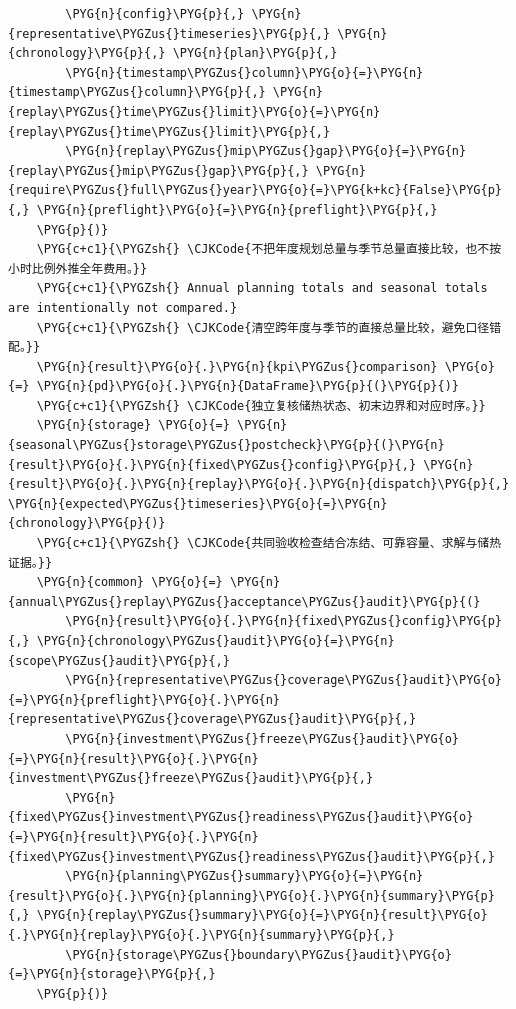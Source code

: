 \begin{Verbatim}
        \PYG{n}{config}\PYG{p}{,} \PYG{n}{representative\PYGZus{}timeseries}\PYG{p}{,} \PYG{n}{chronology}\PYG{p}{,} \PYG{n}{plan}\PYG{p}{,}
        \PYG{n}{timestamp\PYGZus{}column}\PYG{o}{=}\PYG{n}{timestamp\PYGZus{}column}\PYG{p}{,} \PYG{n}{replay\PYGZus{}time\PYGZus{}limit}\PYG{o}{=}\PYG{n}{replay\PYGZus{}time\PYGZus{}limit}\PYG{p}{,}
        \PYG{n}{replay\PYGZus{}mip\PYGZus{}gap}\PYG{o}{=}\PYG{n}{replay\PYGZus{}mip\PYGZus{}gap}\PYG{p}{,} \PYG{n}{require\PYGZus{}full\PYGZus{}year}\PYG{o}{=}\PYG{k+kc}{False}\PYG{p}{,} \PYG{n}{preflight}\PYG{o}{=}\PYG{n}{preflight}\PYG{p}{,}
    \PYG{p}{)}
    \PYG{c+c1}{\PYGZsh{} \CJKCode{不把年度规划总量与季节总量直接比较，也不按小时比例外推全年费用。}}
    \PYG{c+c1}{\PYGZsh{} Annual planning totals and seasonal totals are intentionally not compared.}
    \PYG{c+c1}{\PYGZsh{} \CJKCode{清空跨年度与季节的直接总量比较，避免口径错配。}}
    \PYG{n}{result}\PYG{o}{.}\PYG{n}{kpi\PYGZus{}comparison} \PYG{o}{=} \PYG{n}{pd}\PYG{o}{.}\PYG{n}{DataFrame}\PYG{p}{(}\PYG{p}{)}
    \PYG{c+c1}{\PYGZsh{} \CJKCode{独立复核储热状态、初末边界和对应时序。}}
    \PYG{n}{storage} \PYG{o}{=} \PYG{n}{seasonal\PYGZus{}storage\PYGZus{}postcheck}\PYG{p}{(}\PYG{n}{result}\PYG{o}{.}\PYG{n}{fixed\PYGZus{}config}\PYG{p}{,} \PYG{n}{result}\PYG{o}{.}\PYG{n}{replay}\PYG{o}{.}\PYG{n}{dispatch}\PYG{p}{,} \PYG{n}{expected\PYGZus{}timeseries}\PYG{o}{=}\PYG{n}{chronology}\PYG{p}{)}
    \PYG{c+c1}{\PYGZsh{} \CJKCode{共同验收检查结合冻结、可靠容量、求解与储热证据。}}
    \PYG{n}{common} \PYG{o}{=} \PYG{n}{annual\PYGZus{}replay\PYGZus{}acceptance\PYGZus{}audit}\PYG{p}{(}
        \PYG{n}{result}\PYG{o}{.}\PYG{n}{fixed\PYGZus{}config}\PYG{p}{,} \PYG{n}{chronology\PYGZus{}audit}\PYG{o}{=}\PYG{n}{scope\PYGZus{}audit}\PYG{p}{,}
        \PYG{n}{representative\PYGZus{}coverage\PYGZus{}audit}\PYG{o}{=}\PYG{n}{preflight}\PYG{o}{.}\PYG{n}{representative\PYGZus{}coverage\PYGZus{}audit}\PYG{p}{,}
        \PYG{n}{investment\PYGZus{}freeze\PYGZus{}audit}\PYG{o}{=}\PYG{n}{result}\PYG{o}{.}\PYG{n}{investment\PYGZus{}freeze\PYGZus{}audit}\PYG{p}{,}
        \PYG{n}{fixed\PYGZus{}investment\PYGZus{}readiness\PYGZus{}audit}\PYG{o}{=}\PYG{n}{result}\PYG{o}{.}\PYG{n}{fixed\PYGZus{}investment\PYGZus{}readiness\PYGZus{}audit}\PYG{p}{,}
        \PYG{n}{planning\PYGZus{}summary}\PYG{o}{=}\PYG{n}{result}\PYG{o}{.}\PYG{n}{planning}\PYG{o}{.}\PYG{n}{summary}\PYG{p}{,} \PYG{n}{replay\PYGZus{}summary}\PYG{o}{=}\PYG{n}{result}\PYG{o}{.}\PYG{n}{replay}\PYG{o}{.}\PYG{n}{summary}\PYG{p}{,}
        \PYG{n}{storage\PYGZus{}boundary\PYGZus{}audit}\PYG{o}{=}\PYG{n}{storage}\PYG{p}{,}
    \PYG{p}{)}

\end{Verbatim}
